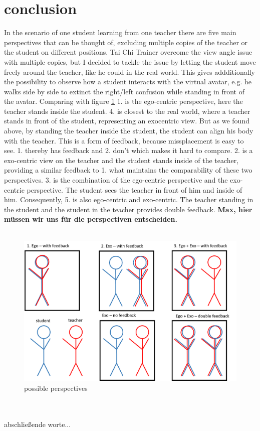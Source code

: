\section{conclusion}
In the scenario of one student learning from one teacher there are five main perspectives that can be thought of, excluding multiple copies of the teacher or the student on different positions. Tai Chi Trainer overcome the view angle issue with multiple copies, but I decided to tackle the issue by letting the student move freely around the teacher, like he could in the real world. This gives addditionally the possibility to observe how a student interacts with the virtual avatar, e.g. he walks side by side to extinct the right/left confusion while standing in front of the avatar. Comparing with figure \ref{fig:perspectives} 1. is the ego-centric perspective, here the teacher stands inside the student. 4. is closest to the real world, where a teacher stands in front of the student, representing an exocentric view. But as we found above, by standing the teacher inside the student, the student can align his body with the teacher. This is a form of feedback, because missplacement is easy to see. 1. thereby has feedback and 2. don't which makes it hard to compare. 2. is a exo-centric view on the teacher and the student stands inside of the teacher, providing a similar feedback to 1. what maintains the comparability of these two perspectives. 3. is the combination of the ego-centric perspective and the exo-centric perspective. The student sees the teacher in front of him and inside of him. Consequently, 5. is also ego-centric and exo-centric. The teacher standing in the student and the student in the teacher provides double feedback.\textbf{ Max, hier müssen wir uns für die perspectiven entscheiden.}\\ \\
\begin{figure}
	\centering
	\includegraphics[width=1.0\textwidth]{img/perspectives.png}
	\caption{possible perspectives}
	\label{fig:perspectives}
\end{figure} \\ \\
abschließende worte...

